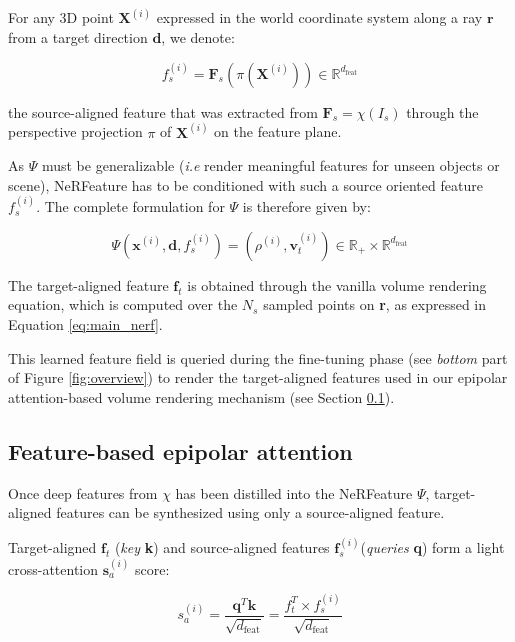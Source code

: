 For any 3D point $\mathbf{X}^{(i)}$ expressed in the world coordinate system along a ray $\mathbf{r}$ from a target direction $\mathbf{d}$, we denote: 

\begin{equation}
    f_{s}^{(i)} = \mathbf{F}_{s}(\pi(\mathbf{X}^{(i)}))  \in \mathbb{R}^{d_{\text{feat}}} 
    \label{eq:projection}
\end{equation}

\noindent the source-aligned feature that was extracted from $\mathbf{F}_{s}=\chi(I_{s})$ through the perspective projection $\pi$ of $\mathbf{X}^{(i)}$ on the feature plane.

As $\Psi$ must be generalizable (\textit{i.e} render meaningful features for unseen objects or scene), NeRFeature has to be conditioned with such a source oriented feature $f_{s}^{(i)}$. The complete formulation for $\Psi$ is therefore given by:

\begin{equation}
    \Psi(\mathbf{x}^{(i)},\mathbf{d},f_{s}^{(i)}) = (\rho^{(i)},\mathbf{v}_{t}^{(i)}) \in \mathbb{R}_{+}\times \mathbb{R}^{d_{\text{feat}}}
\end{equation}

The target-aligned feature $\mathbf{f}_{t}$ is obtained through the vanilla volume rendering equation, which is computed over the $N_s$ sampled points on \textbf{r}, as expressed in Equation \eqref{eq:main_nerf}.

This learned feature field is queried during the fine-tuning phase (see \textit{bottom} part of Figure \ref{fig:overview}) to render the target-aligned features used in our epipolar attention-based volume rendering mechanism (see Section \ref{subsec:epipolar_att}). 

\subsection{Feature-based epipolar attention}
\label{subsec:epipolar_att}

Once deep features from $\chi$ has been distilled into the NeRFeature $\Psi$, target-aligned features can be synthesized using only a source-aligned feature. 

Target-aligned $\mathbf{f}_{t}$ (\textit{key} \textbf{k}) and source-aligned features $\mathbf{f}_{s}^{(i)}$(\textit{queries} \textbf{q}) form a light cross-attention \citep{vaswani2017attention} $\mathbf{s}_{a}^{(i)}$ score:

\begin{equation}
    s_{a}^{(i)} = \frac{\mathbf{q}^{T}\mathbf{k}}{\sqrt{d_{\text{feat}}}}= \frac{f_{t}^{T}\times f_{s}^{(i)}}{\sqrt{d_{\text{feat}}}}
\label{eq:attention}
\end{equation}

